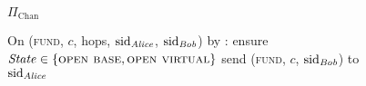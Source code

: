 \begin{figure}[H]
\begin{protocolbox}{$\Pi_{\mathrm{Chan}}$}
\begin{algorithmic}[1]
      \State On (\textsc{fund}, $c$, hops, $\mathrm{sid}_{\mathit{Alice}}$,
      $\mathrm{sid}_{\mathit{Bob}}$) by \environment:
      \Indent
        \State ensure $\mathit{State} \in \{\textsc{open base}, \textsc{open
        virtual}\}$
          \State send (\textsc{fund}, $c$, $\mathrm{sid}_{\mathit{Bob}}$) to
          $\mathrm{sid}_{\mathit{Alice}}$
        \EndIf
      \EndIndent
    \end{algorithmic}
  \end{protocolbox}
  \caption{}
  \label{code:protocol:chan:skeleton}
\end{figure}
